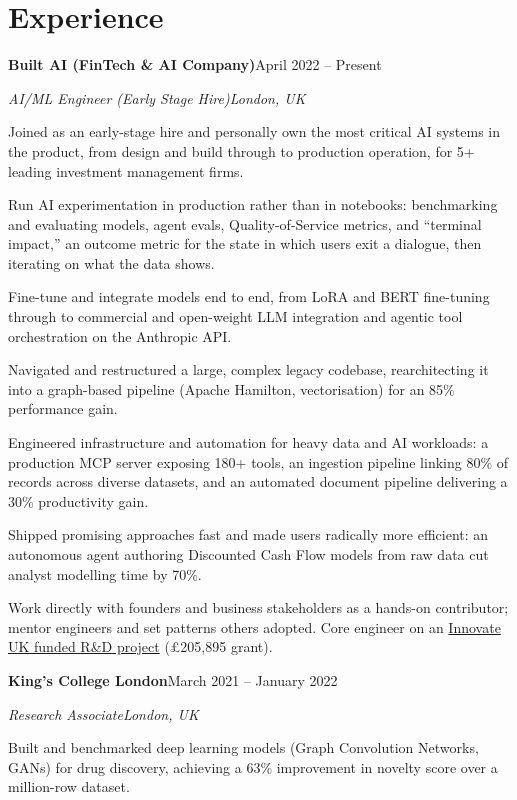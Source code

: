 \documentclass[10pt,a4paper]{article}
\newcommand{\entry}[4]{%
  {\color{company}\bfseries #1}\hfill {\color{muted}#2}\par
  \vspace{1pt}
  {\itshape #3}\hfill {\color{muted}\itshape #4}\par
  \vspace{3pt}%
}
\begin{document}
\section{Experience}
\entry{Built AI (FinTech \& AI Company)}{April 2022 -- Present}{AI/ML Engineer (Early Stage Hire)}{London, UK}
\begin{tight}
  \item Joined as an early-stage hire and personally own the most critical AI systems in the product, from design and build through to production operation, for 5+ leading investment management firms.
  \item Run AI experimentation in production rather than in notebooks: benchmarking and evaluating models, agent evals, Quality-of-Service metrics, and ``terminal impact,'' an outcome metric for the state in which users exit a dialogue, then iterating on what the data shows.
  \item Fine-tune and integrate models end to end, from LoRA and BERT fine-tuning through to commercial and open-weight LLM integration and agentic tool orchestration on the Anthropic API.
  \item Navigated and restructured a large, complex legacy codebase, rearchitecting it into a graph-based pipeline (Apache Hamilton, vectorisation) for an 85\% performance gain.
  \item Engineered infrastructure and automation for heavy data and AI workloads: a production MCP server exposing 180+ tools, an ingestion pipeline linking 80\% of records across diverse datasets, and an automated document pipeline delivering a 30\% productivity gain.
  \item Shipped promising approaches fast and made users radically more efficient: an autonomous agent authoring Discounted Cash Flow models from raw data cut analyst modelling time by 70\%.
  \item Work directly with founders and business stakeholders as a hands-on contributor; mentor engineers and set patterns others adopted. Core engineer on an \href{https://gtr.ukri.org/projects?ref=10022996}{Innovate UK funded R\&D project} (\pounds205,895 grant).
\end{tight}

\entry{King's College London}{March 2021 -- January 2022}{Research Associate}{London, UK}
\begin{tight}
  \item Built and benchmarked deep learning models (Graph Convolution Networks, GANs) for drug discovery, achieving a 63\% improvement in novelty score over a million-row dataset.
\end{tight}
\end{document}
